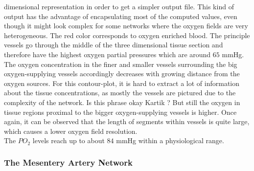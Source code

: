 dimensional representation in order to get a simpler output file. This kind of output has the advantage of encapsulating most of the computed values, even though it might look complex for some networks where the oxygen fields are very heterogeneous. The red color corresponds to oxygen enriched blood. The principle vessels go through the middle of the three dimensional tissue section and therefore have the highest oxygen partial pressures which are around $65$ mmHg. The oxygen concentration in the finer and smaller vessels surrounding the big oxygen-supplying vessels accordingly decreases with growing distance from the oxygen sources. {\color{red}For this contour-plot, it is hard to extract a lot of information about the tissue concentrations, as mostly the vessels are pictured due to the complexity of the network. Is this phrase okay Kartik ?}
But still the oxygen in tissue regions proximal to the bigger oxygen-supplying vessels is higher. Once again, it can be observed that the length of segments within vessels is quite large, which causes a lower oxygen field resolution.
\\The $PO_2$ levels reach up to about $84$ mmHg within a physiological range.

\newpage
\subsubsection*{The Mesentery Artery Network}

